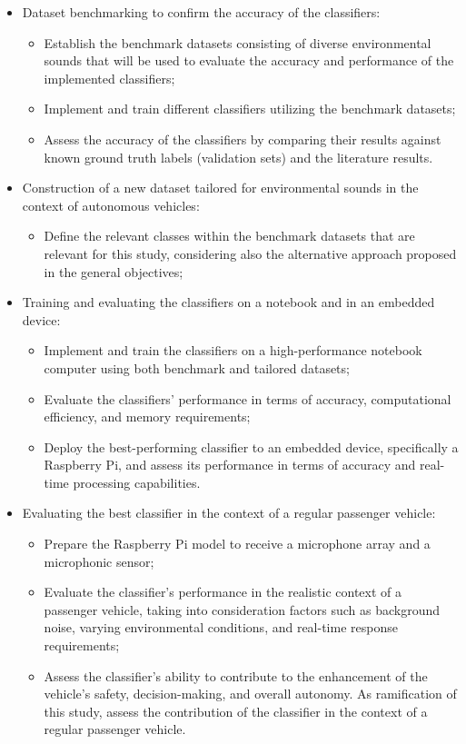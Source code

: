 \begin{itemize}
    \item Dataset benchmarking to confirm the accuracy of the classifiers:
    \begin{itemize}
        \item Establish the benchmark datasets consisting of diverse environmental sounds that will be used to evaluate the accuracy and performance of the implemented classifiers;
        \item Implement and train different classifiers utilizing the benchmark datasets;
        \item Assess the accuracy of the classifiers by comparing their results against known ground truth labels (validation sets) and the literature results.
    \end{itemize}
    \item Construction of a new dataset tailored for environmental sounds in the  context of autonomous vehicles:
    \begin{itemize}
        \item Define the relevant classes within the benchmark datasets that are relevant for this study, considering also the alternative approach proposed in the general objectives;
    \end{itemize}
    \item Training and evaluating the classifiers on a notebook and in an embedded device:
    \begin{itemize}
        \item Implement and train the classifiers on a high-performance notebook computer using both benchmark and tailored datasets;
        \item Evaluate the classifiers' performance in terms of accuracy, computational efficiency, and memory requirements;
        \item Deploy the best-performing classifier to an embedded device, specifically a Raspberry Pi, and assess its performance in terms of accuracy and real-time processing capabilities.
    \end{itemize}
    \item Evaluating the best classifier in the context of a regular passenger vehicle:
    \begin{itemize}
        \item Prepare the Raspberry Pi model to receive a microphone array and a microphonic sensor;
        \item Evaluate the classifier's performance in the realistic context of a passenger vehicle, taking into consideration factors such as background noise, varying environmental conditions, and real-time response requirements;
        \item Assess the classifier's ability to contribute to the enhancement of the vehicle's safety, decision-making, and overall autonomy. As ramification of this study, assess the contribution of the classifier in the context of a regular passenger vehicle.
    \end{itemize}
\end{itemize}



